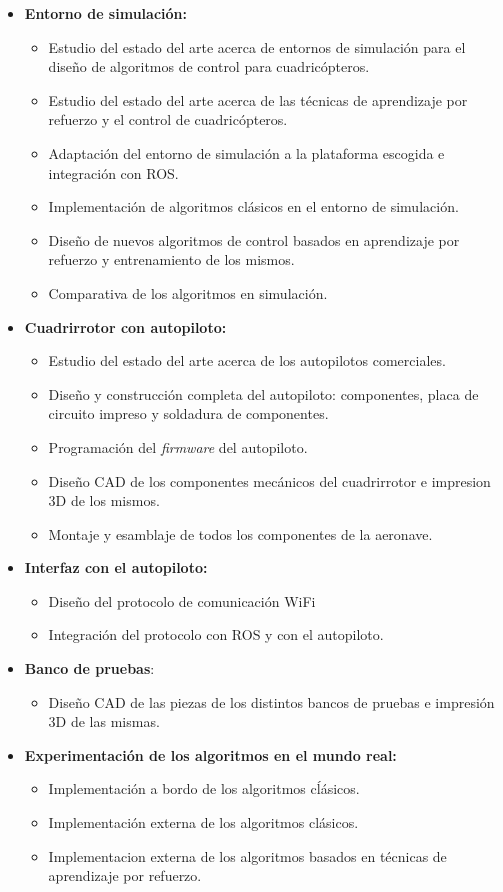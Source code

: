  \begin{itemize}
 	\item \textbf{Entorno de simulación:}
 	\begin{itemize}
 		\item Estudio del estado del arte acerca de entornos de simulación para el diseño de algoritmos de control para cuadricópteros.
 		\item Estudio del estado del arte acerca de las técnicas de aprendizaje por refuerzo y el control de cuadricópteros.
 		\item Adaptación del entorno de simulación a la plataforma escogida e integración con ROS.
 		\item Implementación de algoritmos clásicos en el entorno de simulación.
 		\item Diseño de nuevos algoritmos de control basados en aprendizaje por refuerzo y entrenamiento de los mismos.
 		\item Comparativa de los algoritmos en simulación.
 	\end{itemize}
 	\item \textbf{Cuadrirrotor con autopiloto:}
 	\begin{itemize}
 		\item Estudio del estado del arte acerca de los autopilotos comerciales.
 		\item Diseño y construcción completa del autopiloto: componentes, placa de circuito impreso y soldadura de componentes.
 		\item Programación del \textit{firmware} del autopiloto.
 		\item Diseño CAD de los componentes mecánicos del cuadrirrotor e impresion 3D de los mismos.
 		\item Montaje y esamblaje de todos los componentes de la aeronave.  
 	\end{itemize}
 	\item \textbf{Interfaz con el autopiloto:}
 	\begin{itemize}
		\item Diseño del protocolo de comunicación WiFi
		\item Integración del protocolo con ROS y con el autopiloto.
	\end{itemize}
	\item \textbf{Banco de pruebas}:
		\begin{itemize}
			\item Diseño CAD de las piezas de los distintos bancos de pruebas e impresión 3D de las mismas. 
		\end{itemize}
	\item \textbf{Experimentación de los algoritmos en el mundo real:} 	\begin{itemize}
			\item Implementación a bordo de los algoritmos cĺásicos.
			\item Implementación externa de los algoritmos clásicos.
			\item Implementacion externa de los algoritmos basados en técnicas de aprendizaje por refuerzo. 
		\end{itemize}
 \end{itemize}
